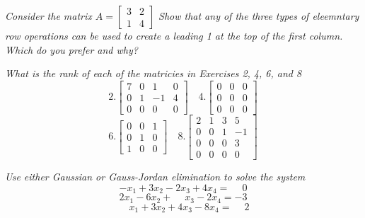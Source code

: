 \documentclass[12pt,letterpaper]{hmcpset}
\begin{document}
\begin{solution}

\end{solution}

\newpage

\begin{problem}[2.2.22]
\textit{ Consider the matrix $ A= \begin{bmatrix}
3&2\\1&4
\end{bmatrix}$ Show that any of the three types of eleemntary row operations can be used to create a leading 1 at the top of the first column. Which do you prefer and why? }
\end{problem}

\begin{solution}

\end{solution}

\newpage

\begin{problem}[2.2.23]
\textit{What is the rank of each of the matricies in Exercises 2, 4, 6, and 8}
$$ 2. \begin{bmatrix}
7&0&1&0\\0&1&-1&4\\0&0&0&0
\end{bmatrix}
\quad
4.\begin{bmatrix}
	0&0&0\\
	0&0&0\\
	0&0&0
\end{bmatrix}
$$
$$ 6.\begin{bmatrix}
	0&0&1\\
	0&1&0\\
	1&0&0
\end{bmatrix}
\quad
8.  \begin{bmatrix}
2&1&3&5\\0&0&1&-1\\0&0&0&3\\0&0&0&0
\end{bmatrix}
$$
\end{problem}

\begin{solution}

\end{solution}

\newpage

\begin{problem}[2.2.30]
\textit{Use either Gaussian or Gauss-Jordan elimination to solve the system} 
$$ -x_1+3x_2-2x_3+4x_4 = \phantom-0$$
$$2x_1-6x_2+ \phantom-x_3-2x_4 = -3$$
$$ \phantom-x_1+3x_2+4x_3-8x_4 = \phantom-2$$
\end{problem}
\end{document}
